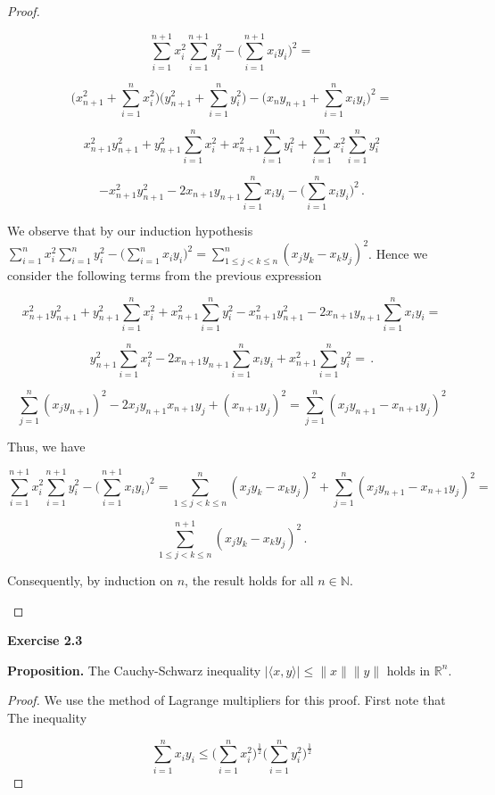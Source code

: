 \documentclass[a4paper]{article}
\numberwithin{equation}{section}
\begin{document}
\begin{description}
\begin{proof}
\begin{description}
$$\sum_{i=1}^{n+1} x_i^2\sum_{i=1}^{n+1}y_i^2 -   \Big(\sum_{i=1}^{n+1}x_iy_i\Big)^2 = $$

$$\Big(x_{n+1}^2 + \sum_{i=1}^{n} x_i^2\Big)\Big(y_{n+1}^2 + \sum_{i=1}^{n}y_i^2\Big) -   \Big(x_{n}y_{n+1} + \sum_{i=1}^{n}x_iy_i\Big)^2 = $$

$$x_{n+1}^2y_{n+1}^2 + y_{n+1}^2\sum_{i=1}^{n} x_i^2 + x_{n+1}^2\sum_{i=1}^{n}y_i^2 + \sum_{i=1}^{n}x_i^2\sum_{i=1}^{n}y_i^2 $$

$$- x_{n+1}^2y_{n+1}^2 - 2x_{n+1}y_{n+1}\sum_{i=1}^{n}x_iy_i - \Big(\sum_{i=1}^{n}x_iy_i\Big)^2\,.$$

We observe that by our induction hypothesis $\sum_{i=1}^{n} x_i^2\sum_{i=1}^{n}y_i^2 -   \Big(\sum_{i=1}^{n}x_iy_i\Big)^2 = \sum_{1 \leq j < k \le n}^n (x_jy_k - x_ky_j)^2$. Hence we consider the following terms from the previous expression

$$x_{n+1}^2y_{n+1}^2 + y_{n+1}^2\sum_{i=1}^{n} x_i^2 + x_{n+1}^2\sum_{i=1}^{n}y_i^2- x_{n+1}^2y_{n+1}^2 - 2x_{n+1}y_{n+1}\sum_{i=1}^{n}x_iy_i = $$

$$y_{n+1}^2\sum_{i=1}^{n} x_i^2 - 2x_{n+1}y_{n+1}\sum_{i=1}^{n}x_iy_i + x_{n+1}^2\sum_{i=1}^{n}y_i^2 = \,.$$

$$\sum_{j=1}^n (x_jy_{n+1})^2-2x_jy_{n+1}x_{n+1}y_j+(x_{n+1}y_j)^2 = \sum_{j=1}^n (x_jy_{n+1} - x_{n+1}y_j)^2$$

Thus, we have 

$$\sum_{i=1}^{n+1} x_i^2\sum_{i=1}^{n+1}y_i^2 -   \Big(\sum_{i=1}^{n+1}x_iy_i\Big)^2 = \sum_{1 \leq j < k \le n}^n (x_jy_k - x_ky_j)^2 + \sum_{j=1}^n (x_jy_{n+1} - x_{n+1}y_j)^2 = $$

$$\sum_{1 \leq j < k \le n}^{n+1} (x_jy_k - x_ky_j)^2\,.$$

Consequently, by induction on $n$, the result holds for all $n \in \mathbb{N}$.

\end{description}

\end{proof}

\item \textbf{Exercise 2.3}

\item \textbf{Proposition.} The Cauchy-Schwarz inequality $|\langle x,y \rangle| \leq \|x\|\|y\|$ holds in $\mathbb{R}^n$.

\begin{proof} We use the method of Lagrange multipliers for this proof. First note that The inequality

$$\sum_{i=1}^nx_iy_i \leq \Big(\sum_{i=1}^n x_i^2\Big)^{\frac{1}{2}}\Big(\sum_{i=1}^ny_i^2\Big)^{\frac{1}{2}}$$


\end{proof}
\end{description}
\end{document}
